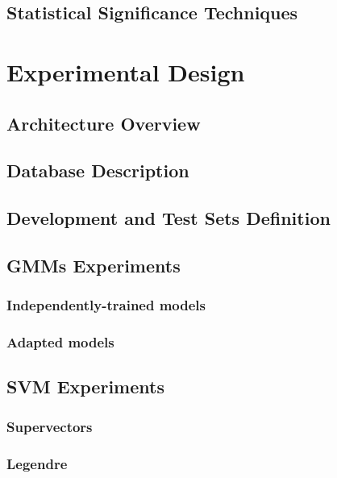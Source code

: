 \documentclass[11pt,a4paper]{tesis}
\begin{document}
	\section{Statistical Significance Techniques}
		

\chapter{Experimental Design}
	\section{Architecture Overview}
		
	\section{Database Description}
	\section{Development and Test Sets Definition}
	\section{GMMs Experiments}
		\subsection{Independently-trained models}
		\subsection{Adapted models}
	\section{SVM Experiments}
		\subsection{Supervectors}
		\subsection{Legendre}
			
\end{document}
